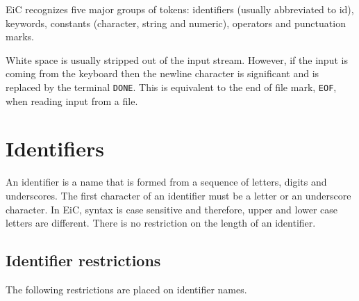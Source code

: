 EiC recognizes five major
groups of tokens: identifiers (usually abbreviated to id), keywords,
constants (character, string and numeric), operators and punctuation
marks.

White space is usually stripped out of the input stream. However, if
the input is coming from the keyboard then the newline character is
significant and is replaced by the terminal {\tt DONE}. This is
equivalent to the end of file mark, {\tt EOF}, when reading input from
a file.

\section{Identifiers}
\label{sec:Identifiers}

An identifier is a name that is formed from a sequence of
letters, digits and underscores. The first character of an
identifier must be a letter or an underscore character.  In
EiC, syntax is case sensitive and therefore, upper and lower case
letters are different. There is no restriction on the length of an
identifier.

\begin{production}
\end{production}


\subsection{Identifier restrictions}
\label{sec:identifierRestrictions}

The following restrictions are placed on identifier names.

